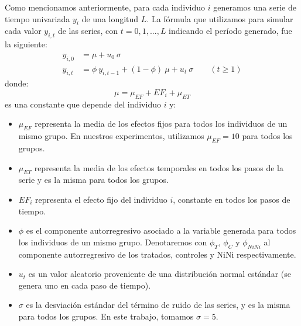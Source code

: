 \documentclass[../../main.tex]{subfiles}
\begin{document}
Como mencionamos anteriormente, para cada individuo \(i\) generamos una serie de tiempo
univariada \(y_i\) de una longitud \(L\). La fórmula que utilizamos para simular cada
valor \(y_{i,t}\) de las series, con \(t = 0, 1, ..., L\) indicando el período generado,
fue la siguiente:
\begin{align}
    y_{i,0} &= \mu + u_0  \ \sigma \\
    y_{i,t} &= \phi \ y_{i,t-1} + (1 - \phi) \ \mu +  u_t \ \sigma \qquad (t \ge 1)
\end{align}
donde:
\[
    \mu = \mu_{EF} + EF_i + \mu_{ET}
\]
es una constante que depende del individuo \(i\) y:
\begin{itemize}[itemsep=0.1cm]
    \item \(\mu_{EF}\) representa la media de los efectos fijos para todos los individuos
    de un mismo grupo. En nuestros experimentos, utilizamos \(\mu_{EF} = 10\) para todos
    los grupos.
    \item \(\mu_{ET}\) representa la media de los efectos temporales en todos los pasos
    de la serie y es la misma para todos los grupos.
    \item \(EF_i\) representa el efecto fijo del individuo \(i\), constante en todos
    los pasos de tiempo.
    \item \(\phi\) es el componente autorregresivo asociado a la variable generada para
    todos los individuos de un mismo grupo. Denotaremos con \(\phi_T\), \(\phi_C\) y
    \(\phi_{NiNi}\) al componente autorregresivo de los tratados, controles y NiNi
    respectivamente.
    \item \(u_t\) es un valor aleatorio proveniente de una distribución normal estándar
    (se genera uno en cada paso de tiempo).
    \item \(\sigma\) es la desviación estándar del término de ruido de las series,
    y es la misma para todos los grupos. En este trabajo, tomamos \(\sigma=5\).
\end{itemize}
\end{document}
